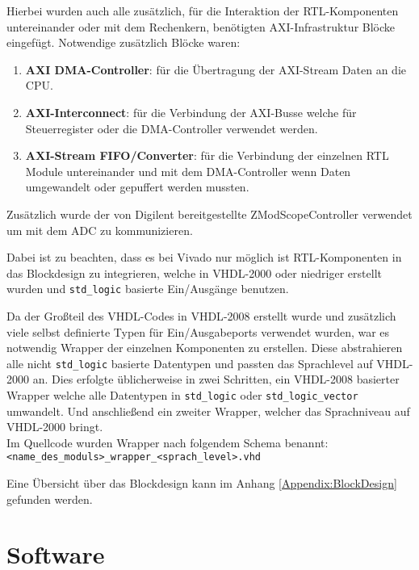 Hierbei wurden auch alle zusätzlich, für die Interaktion der \acs{RTL}-Komponenten untereinander oder mit dem Rechenkern, benötigten AXI-Infrastruktur Blöcke eingefügt.
Notwendige zusätzlich Blöcke waren:
\begin{enumerate}
	\item \textbf{\acs{AXI} \acs{DMA}-Controller}: für die Übertragung der \acs{AXI}-Stream Daten an die \acs{CPU}\cite{XLX_DMA}.
	\item \textbf{\acs{AXI}-Interconnect}: für die Verbindung der \acs{AXI}-Busse welche für Steuerregister oder die \acs{DMA}-Controller verwendet werden\cite{XLX_AXI_INT}.
	\item \textbf{\acs{AXI}-Stream FIFO/Converter}: für die Verbindung der einzelnen \acs{RTL} Module untereinander und mit dem \acs{DMA}-Controller wenn Daten umgewandelt
	oder gepuffert werden mussten\cite{XLX_AXIS}.
\end{enumerate}

Zusätzlich wurde der von Digilent bereitgestellte ZModScopeController\cite{DIG_EZ7_ADC_REF} verwendet um mit dem \acs{ADC} zu kommunizieren.

Dabei ist zu beachten, dass es bei Vivado nur möglich ist \acs{RTL}-Komponenten in das Blockdesign zu integrieren, welche in \acs{VHDL}-2000 oder 
niedriger erstellt wurden und \lstinline|std_logic| basierte Ein/Ausgänge benutzen. 

Da der Großteil des \acs{VHDL}-Codes in \acs{VHDL}-2008 erstellt wurde und zusätzlich viele selbst definierte Typen für Ein/Ausgabeports verwendet wurden, war es notwendig 
Wrapper der einzelnen Komponenten zu erstellen.
Diese abstrahieren alle nicht \lstinline|std_logic| basierte Datentypen und passten das Sprachlevel auf \acs{VHDL}-2000 an. 
Dies erfolgte üblicherweise in zwei Schritten, ein \acs{VHDL}-2008 basierter Wrapper welche alle Datentypen in \lstinline|std_logic| oder \lstinline|std_logic_vector| umwandelt.
Und anschließend ein zweiter Wrapper, welcher das Sprachniveau auf \acs{VHDL}-2000 bringt. \\
Im Quellcode wurden Wrapper nach folgendem Schema benannt:\\
 \lstinline|<name_des_moduls>_wrapper_<sprach_level>.vhd|

Eine Übersicht über das Blockdesign kann im Anhang \ref{Appendix:BlockDesign} gefunden werden.

\section{Software}

